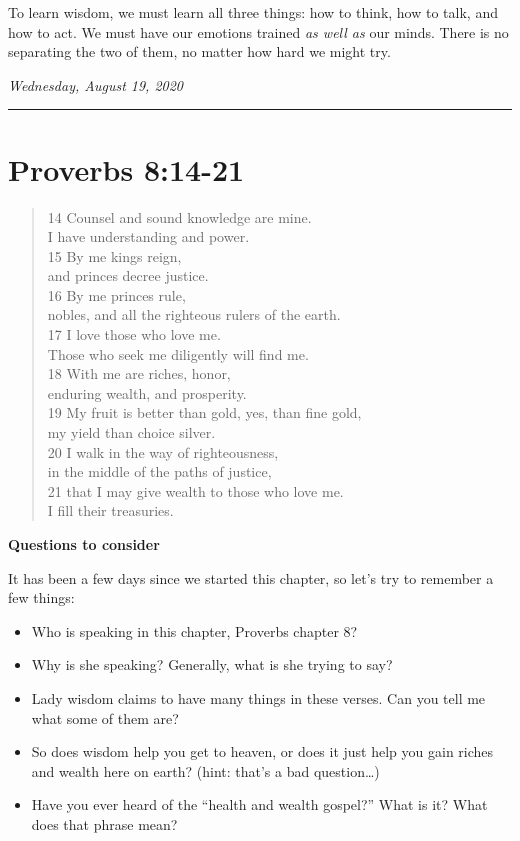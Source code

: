 \documentclass[
]{book}
\providecommand{\tightlist}{%
  \setlength{\itemsep}{0pt}\setlength{\parskip}{0pt}}
\begin{document}
To learn wisdom, we must learn all three things: how to think, how to talk, and how to act. We must have our emotions trained \emph{as well as} our minds. There is no separating the two of them, no matter how hard we might try.

\emph{Wednesday, August 19, 2020}

\begin{center}\rule{0.5\linewidth}{0.5pt}\end{center}

\hypertarget{proverbs-814-21}{%
\section{Proverbs 8:14-21}\label{proverbs-814-21}}

\begin{quote}
14 Counsel and sound knowledge are mine.\\
I have understanding and power.\\
15 By me kings reign,\\
and princes decree justice.\\
16 By me princes rule,\\
nobles, and all the righteous rulers of the earth.\\
17 I love those who love me.\\
Those who seek me diligently will find me.\\
18 With me are riches, honor,\\
enduring wealth, and prosperity.\\
19 My fruit is better than gold, yes, than fine gold,\\
my yield than choice silver.\\
20 I walk in the way of righteousness,\\
in the middle of the paths of justice,\\
21 that I may give wealth to those who love me.\\
I fill their treasuries.
\end{quote}

\textbf{Questions to consider}

It has been a few days since we started this chapter, so let's try to remember a few things:

\begin{itemize}
\tightlist
\item
  Who is speaking in this chapter, Proverbs chapter 8?
\item
  Why is she speaking? Generally, what is she trying to say?
\item
  Lady wisdom claims to have many things in these verses. Can you tell me what some of them are?
\item
  So does wisdom help you get to heaven, or does it just help you gain riches and wealth here on earth? (hint: that's a bad question\ldots)
\item
  Have you ever heard of the ``health and wealth gospel?'' What is it? What does that phrase mean?
\end{itemize}
\end{document}
